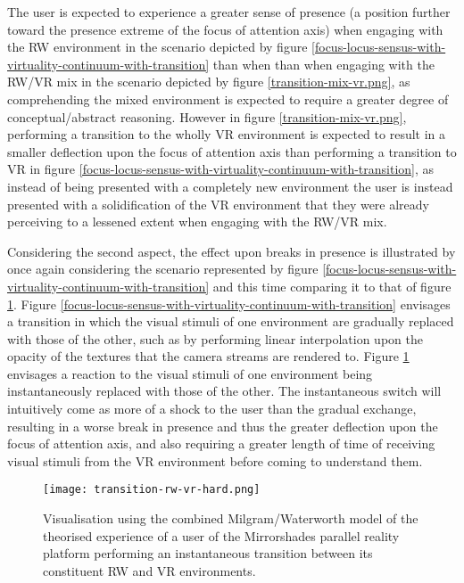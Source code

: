 The user is expected to experience a greater sense of presence (a position further toward the presence extreme of the focus of attention axis) when engaging with the RW environment in the scenario depicted by figure \ref{focus-locus-sensus-with-virtuality-continuum-with-transition} than when than when engaging with the RW/VR mix in the scenario depicted by figure \ref{transition-mix-vr.png}, as comprehending the mixed environment is expected to require a greater degree of conceptual/abstract reasoning. However in figure \ref{transition-mix-vr.png}, performing a transition to the wholly VR environment is expected to result in a smaller deflection upon the focus of attention axis than performing a transition to VR in figure \ref{focus-locus-sensus-with-virtuality-continuum-with-transition}, as instead of being presented with a completely new environment the user is instead presented with a solidification of the VR environment that they were already perceiving to a lessened extent when engaging with the RW/VR mix.

Considering the second aspect, the effect upon breaks in presence is illustrated by once again considering the scenario represented by figure \ref{focus-locus-sensus-with-virtuality-continuum-with-transition} and this time comparing it to that of figure \ref{transition-rw-vr-hard.png}. Figure \ref{focus-locus-sensus-with-virtuality-continuum-with-transition} envisages a transition in which the visual stimuli of one environment are gradually replaced with those of the other, such as by performing linear interpolation upon the opacity of the textures that the camera streams are rendered to. Figure \ref{transition-rw-vr-hard.png} envisages a reaction to the visual stimuli of one environment being instantaneously replaced with those of the other. The instantaneous switch will intuitively come as more of a shock to the user than the gradual exchange, resulting in a worse break in presence and thus the greater deflection upon the focus of attention axis, and also requiring a greater length of time of receiving visual stimuli from the VR environment before coming to understand them.

\begin{figure}[h]
	\begin{center}
		\texttt{[image: transition-rw-vr-hard.png]}
		\caption{Visualisation using the combined Milgram/Waterworth model of the theorised experience of a user of the Mirrorshades parallel reality platform performing an instantaneous transition between its constituent RW and VR environments.}
		\label{transition-rw-vr-hard.png}
	\end{center}
\end{figure}

